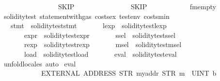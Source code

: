 \begin{isabellebody}
\ \ \ \ \ \ \ \ \ \ \ \ \ \ \ \ {\isacharparenleft}{\kern0pt}{\isacharbrackleft}{\kern0pt}{\isacharbrackright}{\kern0pt}{\isacharcomma}{\kern0pt}\ SKIP{\isacharparenright}{\kern0pt}{\isacharcomma}{\kern0pt}\isanewline
\ \ \ \ \ \ \ \ \ \ \ \ \ \ \ \ SKIP{\isacharparenright}{\kern0pt}\isanewline
\ \ \ \ \ \ \ \ \ \ \ \ fmempty{\isachardoublequoteclose}\isanewline
\isanewline
{}\isamarkupfalse%
\ soliditytest{}{\isacharcolon}{\kern0pt}\ statement{\isacharunderscore}{\kern0pt}with{\isacharunderscore}{\kern0pt}gas\ costs{\isacharunderscore}{\kern0pt}ex\ testenv{}\ costs{\isacharunderscore}{\kern0pt}min\isanewline
\ \ \ stmt{}\ {\isacharequal}{\kern0pt}\ {\isachardoublequoteopen}soliditytest{}{\isachardot}{\kern0pt}stmt{\isachardoublequoteclose}\isanewline
\ \ \ \ \ \ \ lexp{}\ {\isacharequal}{\kern0pt}\ soliditytest{}{\isachardot}{\kern0pt}lexp\ \isanewline
\ \ \ \ \ \ \ expr{}\ {\isacharequal}{\kern0pt}\ soliditytest{}{\isachardot}{\kern0pt}expr\isanewline
\ \ \ \ \ \ \ ssel{}\ {\isacharequal}{\kern0pt}\ soliditytest{}{\isachardot}{\kern0pt}ssel\isanewline
\ \ \ \ \ \ \ rexp{}\ {\isacharequal}{\kern0pt}\ soliditytest{}{\isachardot}{\kern0pt}rexp\isanewline
\ \ \ \ \ \ \ msel{}\ {\isacharequal}{\kern0pt}\ soliditytest{}{\isachardot}{\kern0pt}msel\isanewline
\ \ \ \ \ \ \ load{}\ {\isacharequal}{\kern0pt}\ soliditytest{}{\isachardot}{\kern0pt}load\isanewline
\ \ \ \ \ \ \ eval{}\ {\isacharequal}{\kern0pt}\ soliditytest{}{\isachardot}{\kern0pt}eval\isanewline
%
\isadelimproof
\ \ %
\endisadelimproof
%
\isatagproof
{}\isamarkupfalse%
\ unfold{\isacharunderscore}{\kern0pt}locales\ auto%
\endisatagproof
{\isafoldproof}%
%
\isadelimproof
\isanewline
%
\endisadelimproof
\isanewline
{}\isamarkupfalse%
\ {\isachardoublequoteopen}eval{}\ {}{}{}{}\isanewline
\ \ \ \ \ \ \ \ \ \ \ \ {\isacharparenleft}{\kern0pt}EXTERNAL\ {\isacharparenleft}{\kern0pt}ADDRESS\ {\isacharparenleft}{\kern0pt}STR\ {\isacharprime}{\kern0pt}{\isacharprime}{\kern0pt}myaddr{\isacharprime}{\kern0pt}{\isacharprime}{\kern0pt}{\isacharparenright}{\kern0pt}{\isacharparenright}{\kern0pt}\ {\isacharparenleft}{\kern0pt}STR\ {\isacharprime}{\kern0pt}{\isacharprime}{\kern0pt}m{}{\isacharprime}{\kern0pt}{\isacharprime}{\kern0pt}{\isacharparenright}{\kern0pt}\ {\isacharbrackleft}{\kern0pt}{\isacharbrackright}{\kern0pt}\ {\isacharparenleft}{\kern0pt}UINT\ b{}{}{}\ {}{\isacharparenright}{\kern0pt}{\isacharparenright}{\kern0pt}\isanewline

\end{isabellebody}
